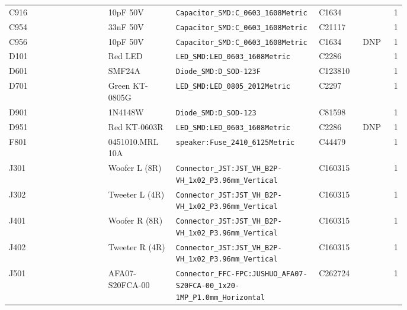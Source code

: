 {\begin{longtable}{@{}>{\raggedright\arraybackslash}p{0.25\linewidth}>{\raggedright\arraybackslash}p{0.17\linewidth}>{\raggedright\arraybackslash}p{0.36\linewidth}l l r@{}}
C916 & 10pF 50V & \texttt{Capacitor\_\allowbreak{}SMD:\allowbreak{}C\_\allowbreak{}0603\_\allowbreak{}1608Metric} & C1634 &  & 1\\
C954 & 33nF 50V & \texttt{Capacitor\_\allowbreak{}SMD:\allowbreak{}C\_\allowbreak{}0603\_\allowbreak{}1608Metric} & C21117 &  & 1\\
C956 & 10pF 50V & \texttt{Capacitor\_\allowbreak{}SMD:\allowbreak{}C\_\allowbreak{}0603\_\allowbreak{}1608Metric} & C1634 & DNP & 1\\
D101 & Red LED & \texttt{LED\_\allowbreak{}SMD:\allowbreak{}LED\_\allowbreak{}0603\_\allowbreak{}1608Metric} & C2286 &  & 1\\
D601 & SMF24A & \texttt{Diode\_\allowbreak{}SMD:\allowbreak{}D\_\allowbreak{}SOD-123F} & C123810 &  & 1\\
D701 & Green KT-0805G & \texttt{LED\_\allowbreak{}SMD:\allowbreak{}LED\_\allowbreak{}0805\_\allowbreak{}2012Metric} & C2297 &  & 1\\
D901 & 1N4148W & \texttt{Diode\_\allowbreak{}SMD:\allowbreak{}D\_\allowbreak{}SOD-123} & C81598 &  & 1\\
D951 & Red KT-0603R & \texttt{LED\_\allowbreak{}SMD:\allowbreak{}LED\_\allowbreak{}0603\_\allowbreak{}1608Metric} & C2286 & DNP & 1\\
F801 & 0451010.MRL 10A & \texttt{speaker:\allowbreak{}Fuse\_\allowbreak{}2410\_\allowbreak{}6125Metric} & C44479 &  & 1\\
J301 & Woofer L (8R) & \texttt{Connector\_\allowbreak{}JST:\allowbreak{}JST\_\allowbreak{}VH\_\allowbreak{}B2P-VH\_\allowbreak{}1x02\_\allowbreak{}P3.96mm\_\allowbreak{}Vertical} & C160315 &  & 1\\
J302 & Tweeter L (4R) & \texttt{Connector\_\allowbreak{}JST:\allowbreak{}JST\_\allowbreak{}VH\_\allowbreak{}B2P-VH\_\allowbreak{}1x02\_\allowbreak{}P3.96mm\_\allowbreak{}Vertical} & C160315 &  & 1\\
J401 & Woofer R (8R) & \texttt{Connector\_\allowbreak{}JST:\allowbreak{}JST\_\allowbreak{}VH\_\allowbreak{}B2P-VH\_\allowbreak{}1x02\_\allowbreak{}P3.96mm\_\allowbreak{}Vertical} & C160315 &  & 1\\
J402 & Tweeter R (4R) & \texttt{Connector\_\allowbreak{}JST:\allowbreak{}JST\_\allowbreak{}VH\_\allowbreak{}B2P-VH\_\allowbreak{}1x02\_\allowbreak{}P3.96mm\_\allowbreak{}Vertical} & C160315 &  & 1\\
J501 & AFA07-S20FCA-00 & \texttt{Connector\_\allowbreak{}FFC-FPC:\allowbreak{}JUSHUO\_\allowbreak{}AFA07-S20FCA-00\_\allowbreak{}1x20-1MP\_\allowbreak{}P1.0mm\_\allowbreak{}Horizontal} & C262724 &  & 1\\

\end{longtable}}
